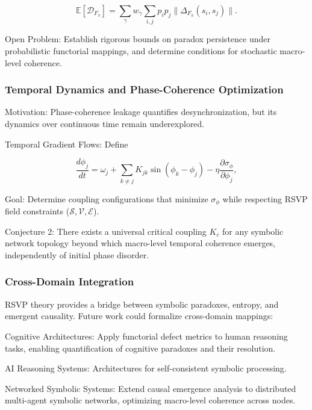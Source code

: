 \documentclass[12pt]{article}
\theoremstyle{plain}
\begin{document}
\begin{equation}
\mathbb{E}[\mathcal{D}_{F_\pi}] = \sum_\gamma w_\gamma \sum_{i,j} p_i p_j \|\Delta_{F_\pi}(s_i, s_j)\|.
\end{equation}

Open Problem: Establish rigorous bounds on paradox persistence under probabilistic functorial mappings, and determine conditions for stochastic macro-level coherence.

\subsubsection{Temporal Dynamics and Phase-Coherence Optimization}

Motivation: Phase-coherence leakage quantifies desynchronization, but its dynamics over continuous time remain underexplored.

Temporal Gradient Flows: Define

\begin{equation}
\frac{d\phi_j}{dt} = \omega_j + \sum_{k \neq j} K_{jk} \sin(\phi_k - \phi_j) - \eta \frac{\partial \sigma_\phi}{\partial \phi_j},
\end{equation}

Goal: Determine coupling configurations that minimize \(\sigma_\phi\) while respecting RSVP field constraints (\(\mathcal{S}, \mathcal{V}, \mathcal{E}\)).

Conjecture 2: There exists a universal critical coupling \(K_c\) for any symbolic network topology beyond which macro-level temporal coherence emerges, independently of initial phase disorder.

\subsubsection{Cross-Domain Integration}

RSVP theory provides a bridge between symbolic paradoxes, entropy, and emergent causality. Future work could formalize cross-domain mappings:

Cognitive Architectures: Apply functorial defect metrics to human reasoning tasks, enabling quantification of cognitive paradoxes and their resolution.

AI Reasoning Systems: Architectures for self-consistent symbolic processing.

Networked Symbolic Systems: Extend causal emergence analysis to distributed multi-agent symbolic networks, optimizing macro-level coherence across nodes.
\end{document}
